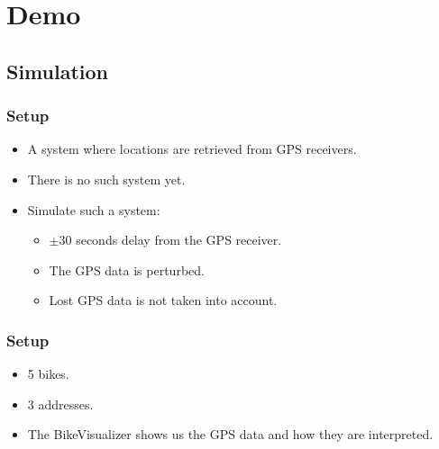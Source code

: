 \section{Demo}
\subsection{Simulation}

\begin{frame}
\frametitle{Setup}
\begin{itemize}
\item A system where locations are retrieved from GPS receivers.
\item There is no such system yet.
\item Simulate such a system:
\begin{itemize}
\item $\pm$30 seconds delay from the GPS receiver.
\item The GPS data is perturbed.
\item Lost GPS data is not taken into account.
\end{itemize}
\end{itemize}
\end{frame}

\begin{frame}
\frametitle{Setup}
\begin{itemize}
\item 5 bikes.
\item 3 addresses.
\item The BikeVisualizer shows us the GPS data and how they are interpreted.
\end{itemize}
\end{frame}


